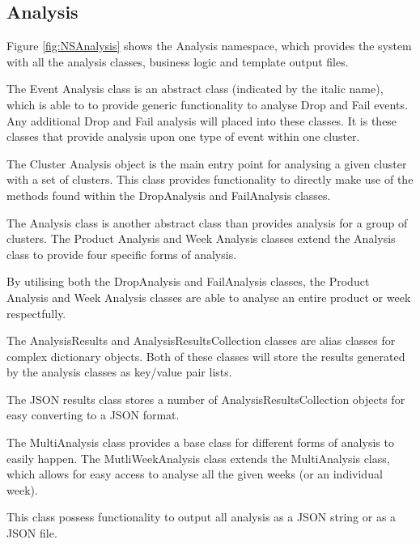 \subsection{Analysis}
Figure \ref{fig:NSAnalysis} shows the Analysis namespace, which provides the 
system with all the analysis classes, business logic and template output files. 

The Event Analysis class is an abstract class (indicated by the italic name), 
which is able to to provide generic functionality to analyse Drop and Fail 
events. Any additional Drop and Fail analysis will placed into these classes.
It is these classes that provide analysis upon one type of event within one
cluster.

The Cluster Analysis object is the main entry point for analysing a given 
cluster with a set of clusters. This class provides functionality to directly 
make use of the methods found within the DropAnalysis and FailAnalysis classes.

The Analysis class is another abstract class than provides analysis for a group 
of clusters. The Product Analysis and Week Analysis classes extend the Analysis
class to provide four specific forms of analysis. 

By utilising both the DropAnalysis and FailAnalysis classes, the Product 
Analysis and Week Analysis classes are able to analyse an entire product or 
week respectfully.

The AnalysisResults and AnalysisResultsCollection classes are alias classes for
complex dictionary objects. Both of these classes will store the results 
generated by the analysis classes as key/value pair lists. 

The JSON results class stores a number of AnalysisResultsCollection objects for
easy converting to a JSON format.

The MultiAnalysis class provides a base class for different forms of analysis 
to easily happen. The MutliWeekAnalysis class extends the MultiAnalysis class, 
which allows for easy access to analyse all the given weeks (or an individual 
week). 

This class possess functionality to output all analysis as a JSON string or as 
a JSON file.

